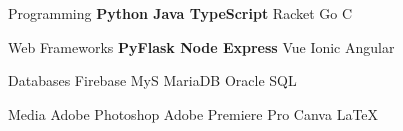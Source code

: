 

\begin{cvskills}

  \cvskill
  {Programming} %
  {\textbf{Python {\enskip\cdotp\enskip} Java {\enskip\cdotp\enskip} TypeScript} {\enskip\cdotp\enskip} Racket {\enskip\cdotp\enskip} Go {\enskip\cdotp\enskip} C } %

  \cvskill
  {Web Frameworks} %
  {\textbf{PyFlask {\enskip\cdotp\enskip} Node Express} {\enskip\cdotp\enskip} Vue {\enskip\cdotp\enskip} Ionic Angular}%

  \cvskill
  {Databases} %
  {Firebase {\enskip\cdotp\enskip} MyS {\enskip\cdotp\enskip} MariaDB {\enskip\cdotp\enskip} Oracle SQL} %


  \cvskill
  {Media} %
  {Adobe Photoshop {\enskip\cdotp\enskip} Adobe Premiere Pro {\enskip\cdotp\enskip} Canva {\enskip\cdotp\enskip} \LaTeX} %



\end{cvskills}
